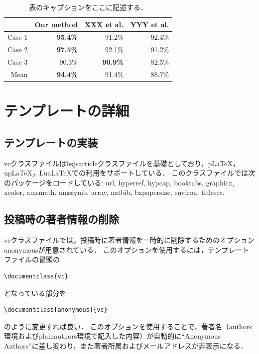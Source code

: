 \documentclass[anonymous]{vc}
\begin{document}
\begin{table}
  \centering
  \caption{表のキャプションをここに記述する．}
  \label{tab:accuracy}
  \begin{tabular}{@{}rrrr@{}}
    \toprule
    & Our method & XXX et al. & YYY et al. \\
    \midrule
    Case 1 & \textbf{95.4\%} &         91.2\%  & 92.4\% \\
    Case 2 & \textbf{97.5\%} &         92.1\%  & 91.2\% \\
    Case 3 &         90.3\%  & \textbf{90.9\%} & 82.5\% \\
    \midrule
    Mean   & \textbf{94.4\%} &         91.4\%  & 88.7\% \\
    \bottomrule
  \end{tabular}
\end{table}

\section{テンプレートの詳細}

\subsection{テンプレートの実装}

\textsf{vc}クラスファイルは\textsf{bxjsarticle}クラスファイルを基礎としており，pLaTeX，upLaTeX，LuaLaTeXでの利用をサポートしている．
このクラスファイルでは次のパッケージをロードしている:
\textsf{url},
\textsf{hyperref},
\textsf{hypcap},
\textsf{booktabs},
\textsf{graphicx},
\textsf{xcolor},
\textsf{amsmath},
\textsf{amssymb},
\textsf{array},
\textsf{natbib},
\textsf{bxpapersize},
\textsf{environ},
\textsf{titlesec}.

\subsection{投稿時の著者情報の削除}

\textsf{vc}クラスファイルでは，投稿時に著者情報を一時的に削除するためのオプション\textsf{anonymous}が用意されている．
このオプションを使用するには，テンプレートファイルの冒頭の
\begin{verbatim}
\documentclass{vc}
\end{verbatim}
となっている部分を
\begin{verbatim}
\documentclass[anonymous]{vc}
\end{verbatim}
のように変更すれば良い．
このオプションを使用することで，著者名（\textsf{authors}環境および\textsf{plainauthors}環境で記入した内容）が自動的に``Anonymous Authors''に差し変わり，また著者所属およびメールアドレスが非表示になる．
\end{document}
